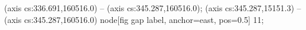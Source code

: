  (axis cs:336.691,160516.0) -- (axis cs:345.287,160516.0);
 (axis cs:345.287,15151.3) -- (axis cs:345.287,160516.0)
  node[fig gap label, anchor=east, pos=0.5] {\texttimes{}11};
